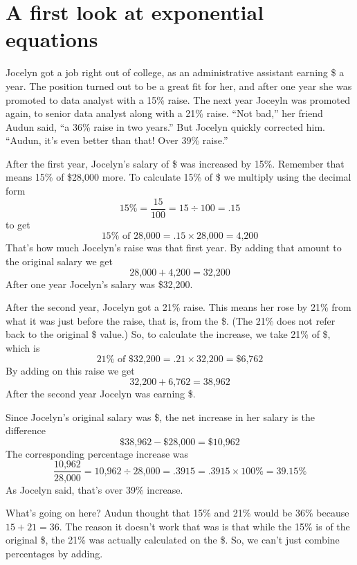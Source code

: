 

\section{A first look at exponential equations}

Jocelyn got a job right out of college, as an administrative assistant earning \$ a year.  The position turned out to be a great fit for her, and after one year she was promoted to data analyst with a 15\% raise.  The next year Joceyln was promoted again, to senior data analyst along with a 21\% raise.  ``Not bad,'' her friend Audun said, ``a 36\% raise in two years.''  But Jocelyn quickly corrected him.  ``Audun, it's even better than that!  Over 39\% raise.''

After the first year, Jocelyn's salary of \$ was increased by 15\%.  Remember that means 15\% of \$28,000 more.  To calculate 15\% of \$ we multiply using the decimal form 
$$15\% = \frac{15}{100} = 15 \div 100 = .15$$
to get 
$$15\% \text{ of  28,000} = .15 \times \text{28,000} = \text{4,200}$$
  That's how much Jocelyn's raise was that first year.  By adding that amount to the original salary we get 
  $$\text{28,000} + \text{4,200} = \text{32,200}$$
After one year Jocelyn's salary was \${32,200}.

After the second year, Jocelyn got a 21\% raise.  This means her rose by 21\% from what it was just before the raise, that is, from the \$.  (The 21\% does not refer back to the original \$ value.)  So, to calculate the increase, we take 21\% of \$, which is 
$$21\% \text{ of  \$32,200} = .21 \times \text{32,200} = \text{\$6,762}$$  
By adding on this raise we get 
$$\text{32,200}+ \text{6,762} = \text{38,962}$$  
After the second year Jocelyn was earning \$.

Since Jocelyn's original salary was \$, the net increase in her salary is the difference 
$$\text{\$38,962} - \text{\$28,000} = \text{\$10,962}$$ The corresponding percentage increase was 
$$\frac{\text{10,962}}{\text{28,000}}= \text{10,962} \div \text{28,000} = .3915 = .3915 \times 100\% = 39.15\%$$  
As Jocelyn said, that's over 39\% increase.  

What's going on here? Audun thought that 15\% and 21\% would be 36\% because $15 + 21 = 36$.
The reason it doesn't work that was is that while the 15\% is of the original \$, the 21\% was actually calculated on the \$.  So, we can't just combine percentages by adding.

